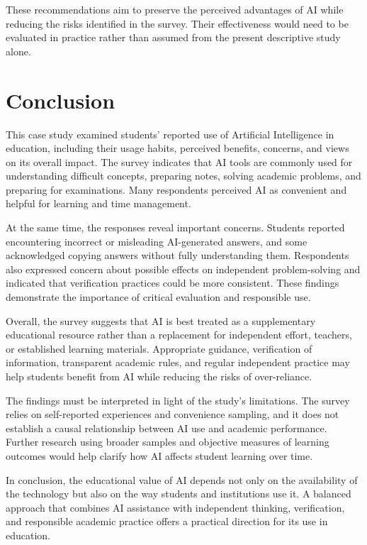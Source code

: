 \documentclass[12pt,a4paper]{article}
\begin{document}
These recommendations aim to preserve the perceived advantages of AI while reducing the risks identified in the survey. Their effectiveness would need to be evaluated in practice rather than assumed from the present descriptive study alone.

\section{Conclusion}
\label{sec:conclusion}

This case study examined students' reported use of Artificial Intelligence in education, including their usage habits, perceived benefits, concerns, and views on its overall impact. The survey indicates that AI tools are commonly used for understanding difficult concepts, preparing notes, solving academic problems, and preparing for examinations. Many respondents perceived AI as convenient and helpful for learning and time management.

At the same time, the responses reveal important concerns. Students reported encountering incorrect or misleading AI-generated answers, and some acknowledged copying answers without fully understanding them. Respondents also expressed concern about possible effects on independent problem-solving and indicated that verification practices could be more consistent. These findings demonstrate the importance of critical evaluation and responsible use.

Overall, the survey suggests that AI is best treated as a supplementary educational resource rather than a replacement for independent effort, teachers, or established learning materials. Appropriate guidance, verification of information, transparent academic rules, and regular independent practice may help students benefit from AI while reducing the risks of over-reliance.

The findings must be interpreted in light of the study's limitations. The survey relies on self-reported experiences and convenience sampling, and it does not establish a causal relationship between AI use and academic performance. Further research using broader samples and objective measures of learning outcomes would help clarify how AI affects student learning over time.

In conclusion, the educational value of AI depends not only on the availability of the technology but also on the way students and institutions use it. A balanced approach that combines AI assistance with independent thinking, verification, and responsible academic practice offers a practical direction for its use in education.
\end{document}
